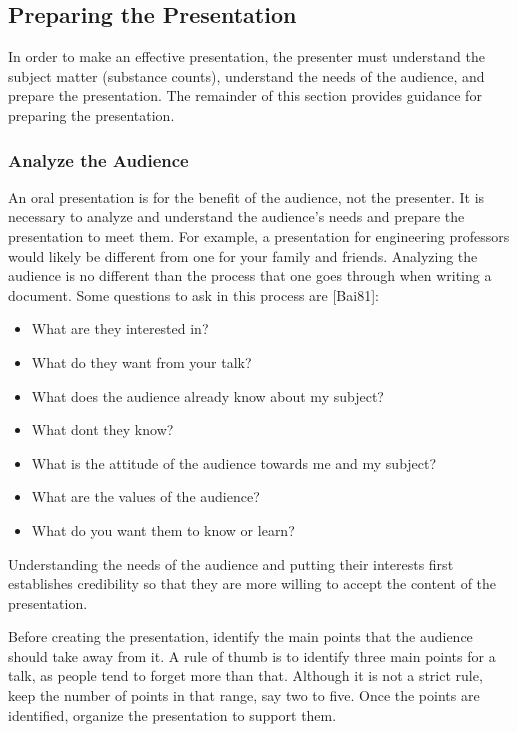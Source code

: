 \subsection{Preparing the
Presentation}\label{preparing-the-presentation}

In order to make an effective presentation, the presenter must
understand the subject matter (substance counts), understand the needs
of the audience, and prepare the presentation. The remainder of this
section provides guidance for preparing the presentation.

\subsubsection*{Analyze the Audience}\label{analyze-the-audience}

An oral presentation is for the benefit of the audience, not the
presenter. It is necessary to analyze and understand the audience's
needs and prepare the presentation to meet them. For example, a
presentation for engineering professors would likely be different from
one for your family and friends. Analyzing the audience is no different
than the process that one goes through when writing a document. Some
questions to ask in this process are {[}Bai81{]}:

\begin{itemize}
\item
  What are they interested in?
\item
  What do they want from your talk?
\item
  What does the audience already know about my subject?
\item
  What don\textquotesingle t they know?
\item
  What is the attitude of the audience towards me and my subject?
\item
  What are the values of the audience?
\item
  What do you want them to know or learn?
\end{itemize}

Understanding the needs of the audience and putting their interests
first establishes credibility so that they are more willing to accept
the content of the presentation.

Before creating the presentation, identify the main points that the
audience should take away from it. A rule of thumb is to identify three
main points for a talk, as people tend to forget more than that.
Although it is not a strict rule, keep the number of points in that
range, say two to five. Once the points are identified, organize the
presentation to support them.


